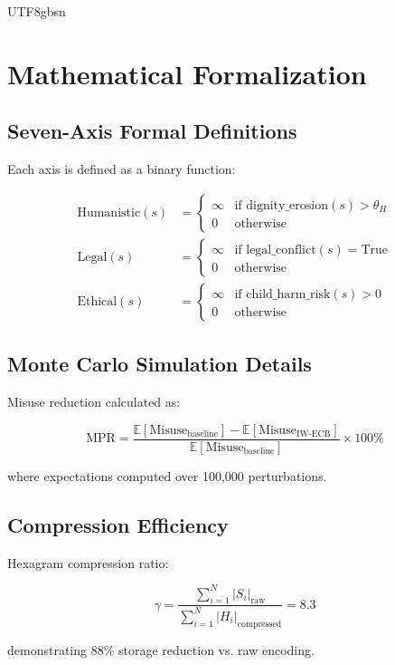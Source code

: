 \documentclass[conference]{IEEEtran}
\begin{document}
\begin{CJK}{UTF8}{gbsn}
\section{Mathematical Formalization}

\subsection{Seven-Axis Formal Definitions}

Each axis is defined as a binary function:

\begin{align}
\text{Humanistic}(s) &= \begin{cases}
\infty & \text{if } \text{dignity\_erosion}(s) > \theta_H \\
0 & \text{otherwise}
\end{cases} \\
\text{Legal}(s) &= \begin{cases}
\infty & \text{if } \text{legal\_conflict}(s) = \text{True} \\
0 & \text{otherwise}
\end{cases} \\
\text{Ethical}(s) &= \begin{cases}
\infty & \text{if } \text{child\_harm\_risk}(s) > 0 \\
0 & \text{otherwise}
\end{cases}
\end{align}

\subsection{Monte Carlo Simulation Details}

Misuse reduction calculated as:

\begin{equation}
\text{MPR} = \frac{\mathbb{E}[\text{Misuse}_{\text{baseline}}] - \mathbb{E}[\text{Misuse}_{\text{IW-ECB}}]}{\mathbb{E}[\text{Misuse}_{\text{baseline}}]} \times 100\%
\end{equation}

where expectations computed over 100,000 perturbations.

\subsection{Compression Efficiency}

Hexagram compression ratio:

\begin{equation}
\gamma = \frac{\sum_{i=1}^{N} |S_i|_{\text{raw}}}{\sum_{i=1}^{N} |H_i|_{\text{compressed}}} = 8.3
\end{equation}

demonstrating 88\% storage reduction vs. raw encoding.

\end{CJK}
\end{document}
